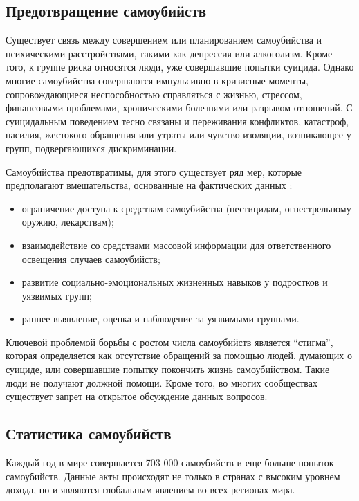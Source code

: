 \subsection{Предотвращение самоубийств}

Существует связь между совершением или планированием самоубийства и психическими расстройствами, такими как депрессия или алкоголизм. Кроме того, к группе риска относятся люди, уже совершавшие попытки суицида. Однако многие самоубийства совершаются импульсивно в кризисные моменты, сопровождающиеся неспособностью справляться с жизнью, стрессом, финансовыми проблемами, хроническими болезнями или разрывом отношений. С суицидальным поведением тесно связаны и переживания конфликтов, катастроф, насилия, жестокого обращения или утраты или чувство изоляции, возникающее у групп, подвергающихся дискриминации. \cite{suicideVOZDouble}

Самоубийства предотвратимы, для этого существует ряд мер, которые предполагают вмешательства, основанные на фактических данных \cite{suicideVOZDouble}:

\begin{itemize}
	\item ограничение доступа к средствам самоубийства (пестицидам, огнестрельному оружию, лекарствам);
	\item взаимодействие со средствами массовой информации для ответственного освещения случаев самоубийств;
	\item развитие социально-эмоциональных жизненных навыков у подростков и уязвимых групп;
	\item раннее выявление, оценка и наблюдение за уязвимыми группами.
\end{itemize}

Ключевой проблемой борьбы с ростом числа самоубийств является ``стигма'', которая определяется как отсутствие обращений за помощью людей, думающих о суициде, или совершавшие попытку покончить жизнь самоубийством. Такие люди не получают должной помощи. Кроме того, во многих сообществах существует запрет на открытое обсуждение данных вопросов. \cite{suicideVOZDouble}

\subsection{Статистика самоубийств}
Каждый год в мире совершается 703 000 самоубийств и еще больше попыток самоубийств. Данные акты происходят не только в странах с высоким уровнем дохода, но и являются глобальным явлением во всех регионах мира. \cite{suicideVOZDouble}

